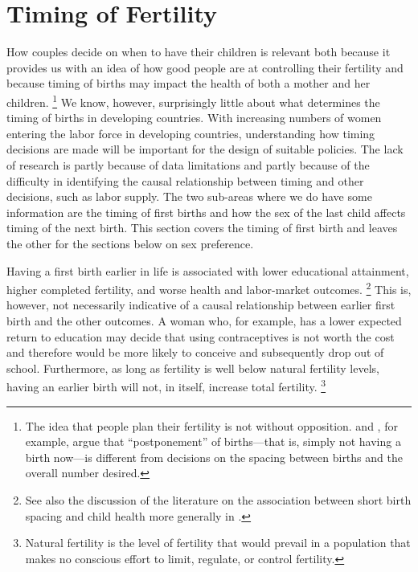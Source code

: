 \documentclass[letterpaper,12pt]{article}
\begin{document}
\section{Timing of Fertility}\label{timing-of-fertility}

How couples decide on when to have their children is relevant both
because it provides us with an idea of how good people are at
controlling their fertility and because timing of births may impact the
health of both a mother and her children.%
\footnote{
The idea that people plan their fertility is not without opposition. 
\citet{Timaeus2008} and \citet{Moultrie2012}, for example, argue that
``postponement'' of births---that is, simply not having a birth now---is
different from decisions on the spacing between births and the overall
number desired.} 
We know, however, surprisingly little about what determines the timing
of births in developing countries. 
With increasing numbers of women entering the labor force in developing
countries, understanding how timing decisions are made will be important
for the design of suitable policies. 
The lack of research is partly because of data limitations and partly
because of the difficulty in identifying the causal relationship between
timing and other decisions, such as labor supply. 
The two sub-areas where we do have some information are the timing of
first births and how the sex of the last child affects timing of the
next birth. 
This section covers the timing of first birth and leaves the other for
the sections below on sex preference.

Having a first birth earlier in life is associated with lower
educational attainment, higher completed fertility, and worse health and
labor-market outcomes.%
\footnote{
See also the discussion of the literature on the association between
short birth spacing and child health more generally in
\citet{Casterline2016}.} 
This is, however, not necessarily indicative of a causal relationship
between earlier first birth and the other outcomes. 
A woman who, for example, has a lower expected return to education may
decide that using contraceptives is not worth the cost and therefore
would be more likely to conceive and subsequently drop out of school. 
Furthermore, as long as fertility is well below natural fertility
levels, having an earlier birth will not, in itself, increase total
fertility.%
\footnote{
Natural fertility is the level of fertility that would prevail in a
population that makes no conscious effort to limit, regulate, or control
fertility.}
\end{document}
